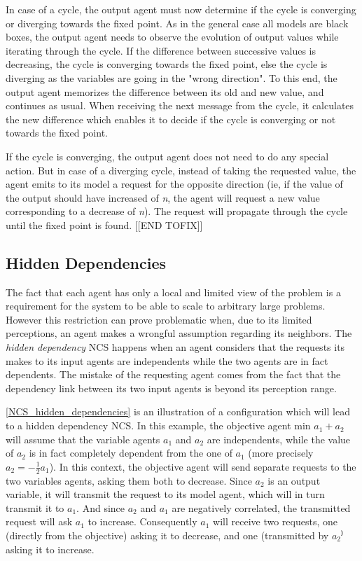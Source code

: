 In case of a cycle, the output agent must now determine if the cycle is converging or diverging towards the fixed point. As in the general case all models are black boxes, the output agent needs to observe the evolution of output values while iterating through the cycle. If the difference between successive values is decreasing, the cycle is converging towards the fixed point, else the cycle is diverging as the variables are going in the "wrong direction". To this end, the output agent memorizes the difference between its old and new value, and continues as usual. When receiving the next message from the cycle, it calculates the new difference which enables it to decide if the cycle is converging or not towards the fixed point.

If the cycle is converging, the output agent does not need to do any special action. But in case of a diverging cycle, instead of taking the requested value, the agent emits to its model a request for the opposite direction (ie, if the value of the output should have increased of \emph{n}, the agent will request a new value corresponding to a decrease of \emph{n}). The request will propagate through the cycle until the fixed point is found.
[[END TOFIX]]

\subsection{Hidden Dependencies}\label{hidden_deps}

The fact that each agent has only a local and limited view of the problem is a requirement for the system to be able to scale to arbitrary large problems. However this restriction can prove problematic when, due to its limited perceptions, an agent makes a wrongful assumption regarding its neighbors. The \emph{hidden dependency} NCS happens when an agent considers that the requests its makes to its input agents are independents while the two agents are in fact dependents. The mistake of the requesting agent comes from the fact that the dependency link between its two input agents is beyond its perception range.

\figurename{} \ref{NCS_hidden_dependencies} is an illustration of a configuration which will lead to a hidden dependency NCS. In this example, the objective agent $\text{min }a_1 + a_2$ will assume that the variable agents $a_1$ and $a_2$ are independents, while the value of $a_2$ is in fact completely dependent from the one of $a_1$ (more precisely $a_2 = -\frac{1}{2} a_1$). In this context, the objective agent will send separate requests to the two variables agents, asking them both to decrease. Since $a_2$ is an output variable, it will transmit the request to its model agent, which will in turn transmit it to $a_1$. And since $a_2$ and $a_1$ are negatively correlated, the transmitted request will ask $a_1$ to increase. Consequently $a_1$ will receive two requests, one (directly from the objective) asking it to decrease, and one (transmitted by $a_2$⁾ asking it to increase.


